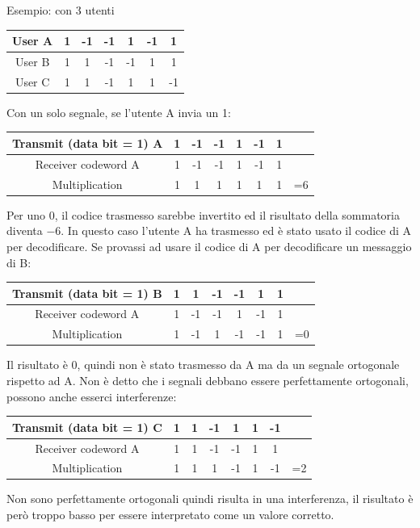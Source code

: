 Esempio: con 3 utenti
\begin{center}
	{
	\renewcommand{\arraystretch}{1.2}
	\begin{tabular}{|c|c|c|c|c|c|c|}
		\hline
		User A & 1 & -1 & -1 & 1 & -1 & 1 \\ 
		\hline
		User B & 1 & 1 & -1 & -1 & 1 & 1 \\ 
		\hline
		User C & 1 & 1 & -1 & 1 & 1 & -1 \\ 
		\hline
	\end{tabular}}
\end{center}
Con un solo segnale, se l'utente A invia un 1:
\begin{center}
	{
	\renewcommand{\arraystretch}{1.2}
	\begin{tabular}{|c|c|c|c|c|c|c|c|}
		\hline
		Transmit (data bit = 1) A & 1 & -1 & -1 & 1 & -1 & 1 & \\ 
		\hline
		Receiver codeword A & 1 & -1 & -1 & 1 & -1 & 1 & \\ 
		\hline
		Multiplication & 1 & 1 & 1 & 1 & 1 & 1 & =6 \\ 
		\hline
	\end{tabular}
	}
\end{center}
Per uno 0, il codice trasmesso sarebbe invertito ed il risultato della sommatoria diventa $-6$. In questo caso l'utente A ha trasmesso ed è stato usato il codice di A per decodificare. Se provassi ad usare il codice di A per decodificare un messaggio di B:
\begin{center}
	{
	\renewcommand{\arraystretch}{1.2}
	\begin{tabular}{|c|c|c|c|c|c|c|c|}
		\hline
		Transmit (data bit = 1) B & 1 & 1 & -1 & -1 & 1 & 1 & \\ 
		\hline
		Receiver codeword A & 1 & -1 & -1 & 1 & -1 & 1 & \\ 
		\hline
		Multiplication & 1 & -1 & 1 & -1 & -1 & 1 & =0 \\ 
		\hline
	\end{tabular}
	}
\end{center}

Il risultato è 0, quindi non è stato trasmesso da A ma da un segnale ortogonale rispetto ad A. Non è detto che i segnali debbano essere perfettamente ortogonali, possono anche esserci interferenze: 
\begin{center}
	{
		\renewcommand{\arraystretch}{1.2}
		\begin{tabular}{|c|c|c|c|c|c|c|c|}
			\hline
			Transmit (data bit = 1) C & 1 & 1 & -1 & 1 & 1 & -1 & \\ 
			\hline
			Receiver codeword A 	 & 1 & 1 & -1 & -1 & 1 & 1 & \\ 
			\hline
			Multiplication 					  & 1 & 1 & 1 & -1 & 1 & -1 & =2 \\ 
			\hline
		\end{tabular}
	}
\end{center}
Non sono perfettamente ortogonali quindi risulta in una interferenza, il risultato è però troppo basso per essere interpretato come un valore corretto.\\

